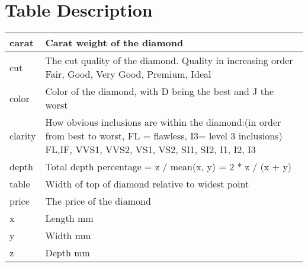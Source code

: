\documentclass{scrreprt}
\begin{document}
		\section{Table Description}
		\begin{tabulary}{\linewidth}{lL}
			carat & Carat weight of the diamond \\\hline
			cut & The cut quality of the diamond. Quality in increasing order Fair, Good, Very Good, Premium, Ideal \\\hline
			color & Color of the diamond, with D being the best and J the worst \\\hline
			clarity & How obvious inclusions are within the diamond:(in order from best to worst, FL = flawless, I3= level 3 inclusions) FL,IF, VVS1, VVS2, VS1, VS2, SI1, SI2, I1, I2, I3 \\\hline
			depth & Total depth percentage = z / mean(x, y) = 2 * z / (x + y) \\\hline
			table & Width of top of diamond relative to widest point  \\\hline
			price & The price of the diamond \\\hline
			x & Length mm \\\hline
			y & Width mm \\\hline
			z & Depth mm \\\hline
		\end{tabulary}
\end{document}
